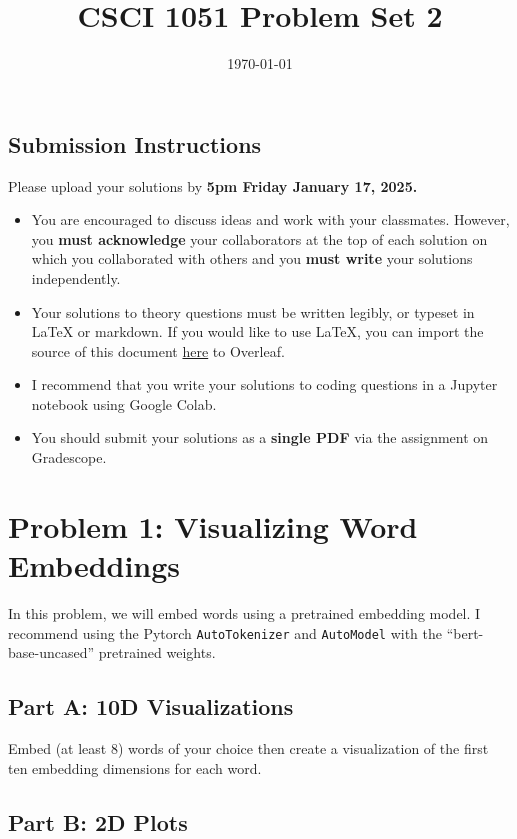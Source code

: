 \documentclass{article}
\title{CSCI 1051 Problem Set 2}
\author{} %
\date{\today}
\begin{document}
\maketitle

\subsection*{Submission Instructions}

Please upload your solutions by
\textbf{5pm Friday January 17, 2025.}
\begin{itemize}
\item You are encouraged to discuss ideas
and work with your classmates. However, you
\textbf{must acknowledge} your collaborators
at the top of each solution on which
you collaborated with others 
and you \textbf{must write} your solutions
independently.
\item Your solutions to theory questions must
be written legibly, or typeset in LaTeX or markdown.
If you would like to use LaTeX, you can import the source of this document 
\href{https://www.rtealwitter.com/deeplearning/psets/pset2.tex}{here}
to Overleaf.
\item I recommend that you write your solutions to coding questions in a Jupyter notebook using Google Colab.
\item You should submit your solutions as a \textbf{single PDF} via the assignment on Gradescope.
\end{itemize}

\newpage \section*{Problem 1: Visualizing Word Embeddings}

In this problem, we will embed words using a pretrained embedding model. I recommend using the Pytorch \texttt{AutoTokenizer} and \texttt{AutoModel} with the ``bert-base-uncased'' pretrained weights.

\subsection*{Part A: 10D Visualizations}

Embed (at least 8) words of your choice then create a visualization of the first ten embedding dimensions for each word.

\subsection*{Part B: 2D Plots}
\end{document}
